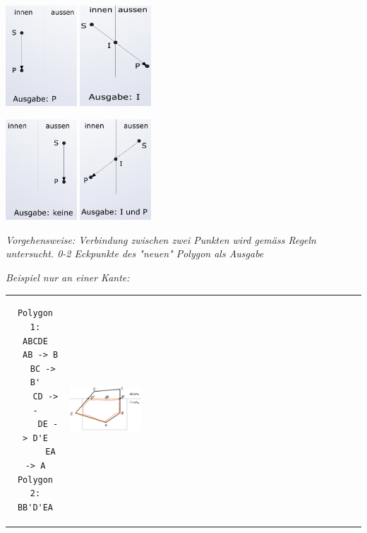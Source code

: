 \includegraphics[width=0.2\textwidth]{assets/Sutherland-Hodgeman1.png}
\includegraphics[width=0.2\textwidth]{assets/Sutherland-Hodgeman2.png}

\includegraphics[width=0.2\textwidth]{assets/Sutherland-Hodgeman3.png}
\includegraphics[width=0.2\textwidth]{assets/Sutherland-Hodgeman4.png}

\textit{Vorgehensweise: Verbindung zwischen zwei Punkten wird gemäss Regeln untersucht. 0-2 Eckpunkte des "neuen" Polygon als Ausgabe}

\textit{Beispiel nur an einer Kante:}

\begin{tabular}{cl}
    \begin{lstlisting}
Polygon 1:
ABCDE
  AB -> B
   BC -> B'
    CD -> -
     DE -> D'E
      EA -> A
Polygon 2:
BB'D'EA
\end{lstlisting} &
    \includegraphics[width=0.25\textwidth]{assets/Sutherland-Hodgeman-example.png}
    \\

\end{tabular}
